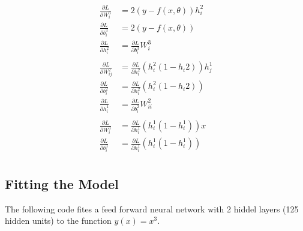 \begin{align*}
    \frac{\partial L}{\partial W_{i}^3} &= 2(y-f(x,\theta))h^2_i\\
    \frac{\partial L}{\partial b_{i}^3} &= 2(y-f(x,\theta))\\
    \frac{\partial L}{\partial h_{i}^2} &= \frac{\partial L}{\partial b_{i}^3}W_i^3 \\\\
    \frac{\partial L}{\partial W_{ij}^2} &= \frac{\partial L}{\partial h_{i}^2}(h_i^2(1-h_i2))h_j^1 \\
    \frac{\partial L}{\partial b_{i}^2} &=  \frac{\partial L}{\partial h_{i}^2}(h_i^2(1-h_i2)) \\
    \frac{\partial L}{\partial h_{i}^1} &= \frac{\partial L}{\partial b_{i}^2}W_{ii}^2 \\\\
    \frac{\partial L}{\partial W_{i}^3} &= \frac{\partial L}{\partial h_{i}^1}(h_i^1(1-h_i^1))x \\
    \frac{\partial L}{\partial b_{i}^3} &= \frac{\partial L}{\partial h_{i}^1}(h_i^1(1-h_i^1)) \\
\end{align*}

\subsection{Fitting the Model}

The following code fites a feed forward neural network with 2 hiddel layers (125 hidden units) to the function $y(x) = x^3$.

